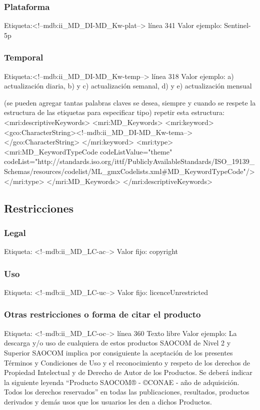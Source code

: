 \documentclass{GVT_CONAE_Class}
\begin{document}
\subsubsection{Plataforma}
Etiqueta:<!--mdb:ii\_MD\_DI-MD\_Kw-plat-->  línea 341
Valor ejemplo: Sentinel-5p

\subsubsection{Temporal}
Etiqueta:<!--mdb:ii\_MD\_DI-MD\_Kw-temp--> línea 318
Valor ejemplo: a) actualización diaria, b) y c) actualización semanal, d) y e) actualización mensual

(se pueden agregar tantas palabras claves se desea, siempre y cuando se respete la estructura de las etiquetas para especificar tipo)
repetir esta estructura:
<mri:descriptiveKeywords>
	<mri:MD\_Keywords>
		<mri:keyword>
			<gco:CharacterString><!--mdb:ii\_MD\_DI-MD\_Kw-tema--></gco:CharacterString>
		</mri:keyword>
		<mri:type>
			<mri:MD\_KeywordTypeCode codeListValue="theme" codeList="http://standards.iso.org/ittf/PubliclyAvailableStandards/ISO\_19139\_Schemas/resources/codelist/ML\_gmxCodelists.xml#MD\_KeywordTypeCode"/>
		</mri:type>
	</mri:MD\_Keywords>
</mri:descriptiveKeywords>

\subsection{Restricciones}
\subsubsection{Legal}
Etiqueta: <!--mdb:ii\_MD\_LC-ac-->
Valor fijo: copyright

\subsubsection{Uso}
Etiqueta: <!--mdb:ii\_MD\_LC-uc-->
Valor fijo: licenceUnrestricted

\subsubsection{Otras restricciones o forma de citar el producto}
Etiqueta: <!--mdb:ii\_MD\_LC-oc--> línea 360
Texto libre
Valor ejemplo: La descarga y/o uso de cualquiera de estos productos SAOCOM de Nivel 2 y Superior SAOCOM implica por consiguiente la aceptación de los presentes Términos y Condiciones de Uso y el reconocimiento y respeto de los derechos de Propiedad Intelectual y de Derecho de Autor de los Productos. Se deberá indicar la siguiente leyenda “Producto SAOCOM® - ©CONAE - año de adquisición. Todos los derechos reservados” en todas las publicaciones, resultados, productos derivados y demás usos que los usuarios les den a dichos Productos.
\end{document}

